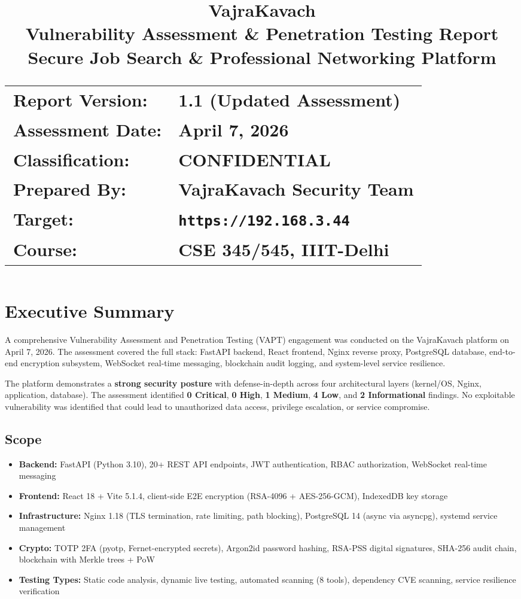 \documentclass[11pt,a4paper]{article}
\title{
  \vspace{-1cm}
  \textbf{\Huge VajraKavach}\\[0.3cm]
  \textbf{\Large Vulnerability Assessment \& Penetration Testing Report}\\[0.5cm]
  \large Secure Job Search \& Professional Networking Platform\\[1cm]
  \normalsize
  \begin{tabular}{ll}
    \textbf{Report Version:} & 1.1 (Updated Assessment) \\
    \textbf{Assessment Date:} & April 7, 2026 \\
    \textbf{Classification:} & CONFIDENTIAL \\
    \textbf{Prepared By:} & VajraKavach Security Team \\
    \textbf{Target:} & \texttt{https://192.168.3.44} \\
    \textbf{Course:} & CSE 345/545, IIIT-Delhi \\
  \end{tabular}
}
\author{}
\date{}
\begin{document}
\maketitle
\thispagestyle{fancy}

\newpage
\tableofcontents
\newpage

\section{Executive Summary}

A comprehensive Vulnerability Assessment and Penetration Testing (VAPT) engagement was conducted on the VajraKavach platform on April 7, 2026. The assessment covered the full stack: FastAPI backend, React frontend, Nginx reverse proxy, PostgreSQL database, end-to-end encryption subsystem, WebSocket real-time messaging, blockchain audit logging, and system-level service resilience.

The platform demonstrates a \textbf{strong security posture} with defense-in-depth across four architectural layers (kernel/OS, Nginx, application, database). The assessment identified \textbf{0 Critical}, \textbf{0 High}, \textbf{1 Medium}, \textbf{4 Low}, and \textbf{2 Informational} findings. No exploitable vulnerability was identified that could lead to unauthorized data access, privilege escalation, or service compromise.

\subsection{Scope}
\begin{itemize}[nosep]
  \item \textbf{Backend:} FastAPI (Python 3.10), 20+ REST API endpoints, JWT authentication, RBAC authorization, WebSocket real-time messaging
  \item \textbf{Frontend:} React 18 + Vite 5.1.4, client-side E2E encryption (RSA-4096 + AES-256-GCM), IndexedDB key storage
  \item \textbf{Infrastructure:} Nginx 1.18 (TLS termination, rate limiting, path blocking), PostgreSQL 14 (async via asyncpg), systemd service management
  \item \textbf{Crypto:} TOTP 2FA (pyotp, Fernet-encrypted secrets), Argon2id password hashing, RSA-PSS digital signatures, SHA-256 audit chain, blockchain with Merkle trees + PoW
  \item \textbf{Testing Types:} Static code analysis, dynamic live testing, automated scanning (8 tools), dependency CVE scanning, service resilience verification
\end{itemize}
\end{document}
